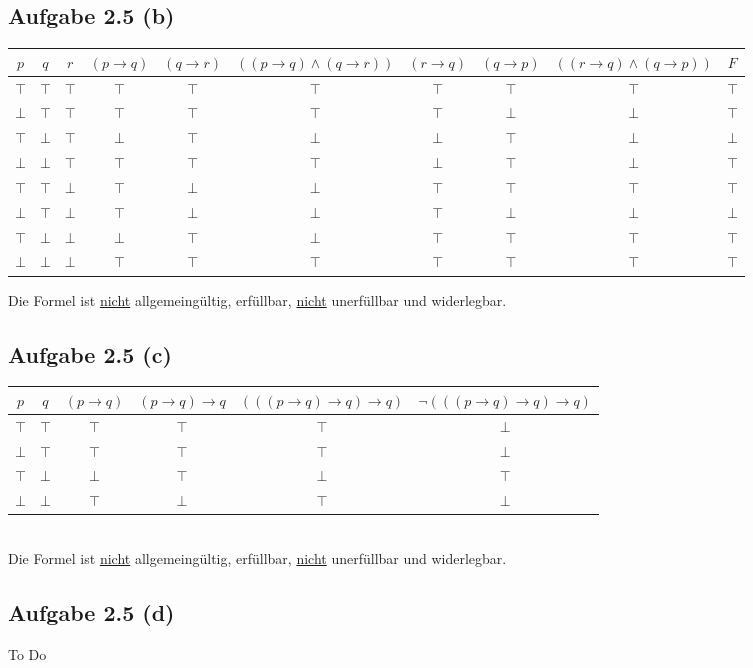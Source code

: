 \documentclass[12pt,a4paper]{article}
\begin{document}
\subsection*{Aufgabe 2.5 (b)}
\begin{landscape}
\begin{tabular}{c|c|c||c|c|c|c|c|c|c}
$p$ & $q$ & $r$ & $(p\to q)$ & $(q\to r)$ & $((p\to q)\wedge(q\to r))$ & $(r\to q)$ & $(q\to p)$ & $((r\to q)\wedge(q\to p))$ & $F$ \\ \hline
$\top$ & $\top$ & $\top$ & $\top$ & $\top$ & $\top$ & $\top$ & $\top$ & $\top$ & $\top$\\
$\bot$ & $\top$ & $\top$ & $\top$ & $\top$ & $\top$ & $\top$ & $\bot$ & $\bot$ & $\top$\\
$\top$ & $\bot$ & $\top$ & $\bot$ & $\top$ & $\bot$ & $\bot$ & $\top$ & $\bot$ & $\bot$\\
$\bot$ & $\bot$ & $\top$ & $\top$ & $\top$ & $\top$ & $\bot$ & $\top$ & $\bot$ & $\top$\\ \hline
$\top$ & $\top$ & $\bot$ & $\top$ & $\bot$ & $\bot$ & $\top$ & $\top$ & $\top$ & $\top$\\
$\bot$ & $\top$ & $\bot$ & $\top$ & $\bot$ & $\bot$ & $\top$ & $\bot$ & $\bot$ & $\bot$\\
$\top$ & $\bot$ & $\bot$ & $\bot$ & $\top$ & $\bot$ & $\top$ & $\top$ & $\top$ & $\top$\\
$\bot$ & $\bot$ & $\bot$ & $\top$ & $\top$ & $\top$ & $\top$ & $\top$ & $\top$ & $\top$
\end{tabular}
\end{landscape}

Die Formel ist \underline{nicht} allgemeingültig, erfüllbar, \underline{nicht} unerfüllbar und widerlegbar.

\subsection*{Aufgabe 2.5 (c)}
\begin{tabular}{c|c||c|c|c|c}
$p$ & $q$ & $(p\to q)$ & $(p\to q)\to q$ & $(((p\to q)\to q)\to q)$ & $\neg(((p\to q)\to q)\to q)$\\ \hline
$\top$ & $\top$ & $\top$ & $\top$ & $\top$ & $\bot$\\
$\bot$ & $\top$ & $\top$ & $\top$ & $\top$ & $\bot$\\
$\top$ & $\bot$ & $\bot$ & $\top$ & $\bot$ & $\top$\\
$\bot$ & $\bot$ & $\top$ & $\bot$ & $\top$ & $\bot$
\end{tabular}\\

Die Formel ist \underline{nicht} allgemeingültig, erfüllbar, \underline{nicht} unerfüllbar und widerlegbar.

\subsection*{Aufgabe 2.5 (d)}
To Do
\end{document}
